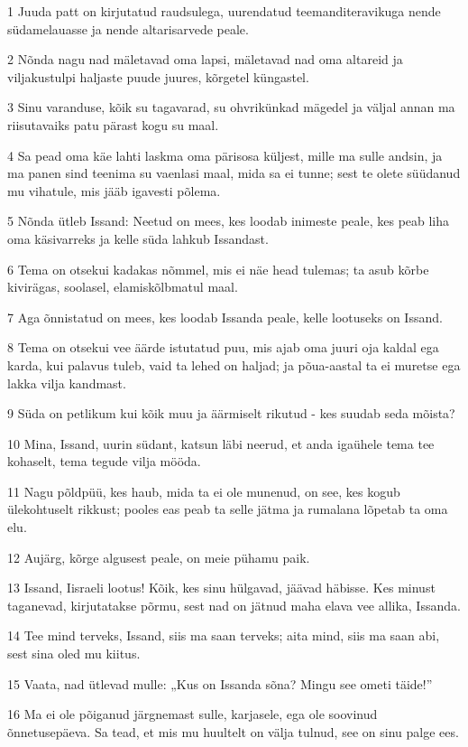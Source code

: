 \par 1 Juuda patt on kirjutatud raudsulega, uurendatud teemanditeravikuga nende südamelauasse ja nende altarisarvede peale.
\par 2 Nõnda nagu nad mäletavad oma lapsi, mäletavad nad oma altareid ja viljakustulpi haljaste puude juures, kõrgetel küngastel.
\par 3 Sinu varanduse, kõik su tagavarad, su ohvrikünkad mägedel ja väljal annan ma riisutavaiks patu pärast kogu su maal.
\par 4 Sa pead oma käe lahti laskma oma pärisosa küljest, mille ma sulle andsin, ja ma panen sind teenima su vaenlasi maal, mida sa ei tunne; sest te olete süüdanud mu vihatule, mis jääb igavesti põlema.
\par 5 Nõnda ütleb Issand: Neetud on mees, kes loodab inimeste peale, kes peab liha oma käsivarreks ja kelle süda lahkub Issandast.
\par 6 Tema on otsekui kadakas nõmmel, mis ei näe head tulemas; ta asub kõrbe kivirägas, soolasel, elamiskõlbmatul maal.
\par 7 Aga õnnistatud on mees, kes loodab Issanda peale, kelle lootuseks on Issand.
\par 8 Tema on otsekui vee äärde istutatud puu, mis ajab oma juuri oja kaldal ega karda, kui palavus tuleb, vaid ta lehed on haljad; ja põua-aastal ta ei muretse ega lakka vilja kandmast.
\par 9 Süda on petlikum kui kõik muu ja äärmiselt rikutud - kes suudab seda mõista?
\par 10 Mina, Issand, uurin südant, katsun läbi neerud, et anda igaühele tema tee kohaselt, tema tegude vilja mööda.
\par 11 Nagu põldpüü, kes haub, mida ta ei ole munenud, on see, kes kogub ülekohtuselt rikkust; pooles eas peab ta selle jätma ja rumalana lõpetab ta oma elu.
\par 12 Aujärg, kõrge algusest peale, on meie pühamu paik.
\par 13 Issand, Iisraeli lootus! Kõik, kes sinu hülgavad, jäävad häbisse. Kes minust taganevad, kirjutatakse põrmu, sest nad on jätnud maha elava vee allika, Issanda.
\par 14 Tee mind terveks, Issand, siis ma saan terveks; aita mind, siis ma saan abi, sest sina oled mu kiitus.
\par 15 Vaata, nad ütlevad mulle: „Kus on Issanda sõna? Mingu see ometi täide!”
\par 16 Ma ei ole põiganud järgnemast sulle, karjasele, ega ole soovinud õnnetusepäeva. Sa tead, et mis mu huultelt on välja tulnud, see on sinu palge ees.
